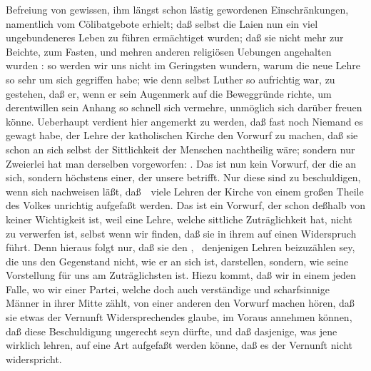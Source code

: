 \begin{aufza}
Befreiung von gewissen, ihm längst schon lästig gewordenen Einschränkungen, namentlich vom Cölibatgebote erhielt; daß selbst die Laien nun ein viel ungebundeneres Leben zu führen ermächtiget wurden; daß sie nicht mehr zur Beichte, zum Fasten, und mehren anderen religiösen Uebungen angehalten wurden \umA : so werden wir uns nicht im Geringsten wundern, warum die neue Lehre so sehr um sich gegriffen habe; wie denn selbst Luther so aufrichtig war, zu gestehen, daß er, wenn er sein Augenmerk auf die Beweggründe richte, um derentwillen sein Anhang so schnell sich vermehre, unmöglich sich darüber freuen könne. Ueberhaupt verdient hier angemerkt zu werden, daß fast noch Niemand es gewagt habe, der Lehre der katholischen Kirche den Vorwurf zu machen, daß sie schon an sich selbst der Sittlichkeit der Menschen nachtheilig wäre; sondern nur Zweierlei hat man derselben vorgeworfen: . Das  ist nun kein Vorwurf, der die  an sich, sondern höchstens einer, der unsere  betrifft. Nur diese sind zu beschuldigen, wenn sich nachweisen läßt, daß~\ viele Lehren der Kirche von einem großen Theile des Volkes unrichtig aufgefaßt werden. Das  ist ein Vorwurf, der schon deßhalb von keiner Wichtigkeit ist, weil eine Lehre, welche sittliche Zuträglichkeit hat, nicht zu verwerfen ist, selbst wenn wir finden, daß sie in ihrem  auf einen Widerspruch führt. Denn hieraus folgt nur, daß sie den , \dh\ denjenigen Lehren beizuzählen sey, die uns den Gegenstand nicht, wie er an sich ist, darstellen, sondern, wie seine Vorstellung für uns am Zuträglichsten ist. Hiezu kommt, daß wir in einem jeden Falle, wo wir einer Partei, welche doch auch verständige und scharfsinnige Männer in ihrer Mitte zählt, von einer anderen den Vorwurf machen hören, daß sie etwas der Vernunft Widersprechendes glaube, im Voraus annehmen können, daß diese Beschuldigung ungerecht seyn dürfte, und daß dasjenige, was jene wirklich lehren, auf eine Art aufgefaßt werden könne, daß es der Vernunft nicht widerspricht.
\end{aufza}

